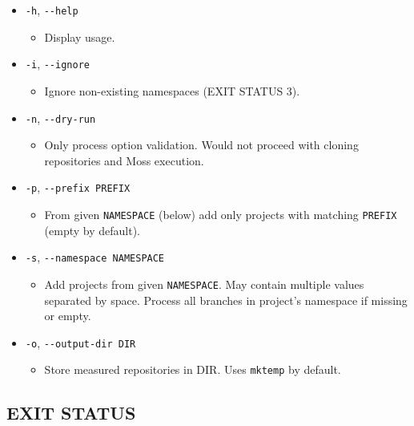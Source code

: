 \begin{itemize}
\item
  \texttt{-h}, \texttt{-\/-help}

  \begin{itemize}
  \item
    Display usage.
  \end{itemize}
\item
  \texttt{-i}, \texttt{-\/-ignore}

  \begin{itemize}
  \item
    Ignore non-existing namespaces (EXIT STATUS 3).
  \end{itemize}
\item
  \texttt{-n}, \texttt{-\/-dry-run}

  \begin{itemize}
  \item
    Only process option validation. Would not proceed with cloning repositories and Moss execution.
  \end{itemize}
\item
  \texttt{-p}, \texttt{-\/-prefix\ PREFIX}

  \begin{itemize}
  \item
    From given \texttt{NAMESPACE} (below) add only projects with matching \texttt{PREFIX} (empty by default).
  \end{itemize}
\item
  \texttt{-s}, \texttt{-\/-namespace\ NAMESPACE}

  \begin{itemize}
  \item
    Add projects from given \texttt{NAMESPACE}. May contain multiple values separated by space. Process all branches in project's namespace if missing or empty.
  \end{itemize}
\item
  \texttt{-o}, \texttt{-\/-output-dir\ DIR}

  \begin{itemize}
  \item
    Store measured repositories in DIR. Uses \texttt{mktemp} by default.
  \end{itemize}
\end{itemize}

\subsection{EXIT STATUS}\label{exit-status-4}

